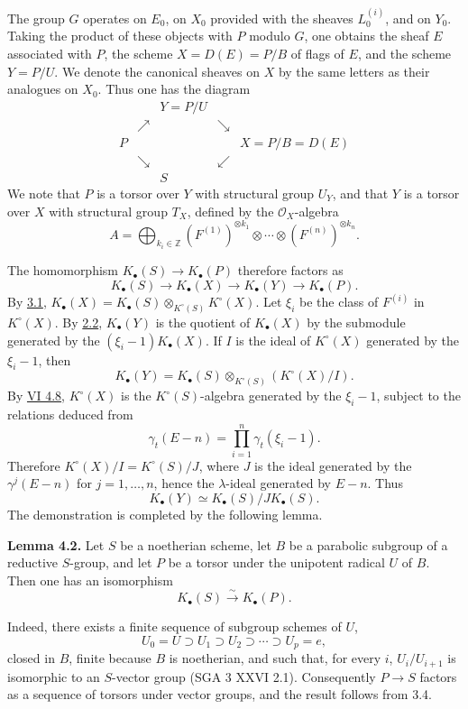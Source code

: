 The group $G$ operates on $E_0$, on $X_0$ provided with the sheaves $L_0^{(i)}$, and on $Y_0$. Taking the product of these objects with $P$ modulo $G$, one obtains the sheaf $E$ associated with $P$, the scheme $X=D(E)=P/B$ of flags of $E$, and the scheme $Y=P/U$. We denote the canonical sheaves on $X$ by the same letters as their analogues on $X_0$. Thus one has the diagram
\[
\begin{array}{ccccc}
&& Y=P/U &&\\[-0.2em]
& \nearrow && \searrow &\\[-0.2em]
P &&&& X=P/B=D(E)\\[-0.2em]
& \searrow && \swarrow &\\[-0.2em]
&& S &&
\end{array}
\]
We note that $P$ is a torsor over $Y$ with structural group $U_Y$, and that $Y$ is a torsor over $X$ with structural group $T_X$, defined by the $\mathcal O_X$-algebra
\[
 A=\bigoplus_{k_i\in\mathbb Z}(F^{(1)})^{\otimes k_1}\otimes\cdots\otimes(F^{(n)})^{\otimes k_n}.
\]

The homomorphism $K_\bullet(S)\to K_\bullet(P)$ therefore factors as
\[
 K_\bullet(S)\longrightarrow K_\bullet(X)\longrightarrow K_\bullet(Y)\longrightarrow K_\bullet(P).
\]
By \hyperlink{sga6.e09.prop.3-1}{3.1}, $K_\bullet(X)=K_\bullet(S)\otimes_{K^\circ(S)}K^\circ(X)$. Let $\xi_i$ be the class of $F^{(i)}$ in $K^\circ(X)$. By \hyperlink{sga6.e09.prop.2-2}{2.2}, $K_\bullet(Y)$ is the quotient of $K_\bullet(X)$ by the submodule generated by the $(\xi_i-1)K_\bullet(X)$. If $I$ is the ideal of $K^\circ(X)$ generated by the $\xi_i-1$, then
\[
 K_\bullet(Y)=K_\bullet(S)\otimes_{K^\circ(S)}(K^\circ(X)/I).
\]
By \hyperlink{sga6.e06.cor.4-8}{VI 4.8}, $K^\circ(X)$ is the $K^\circ(S)$-algebra generated by the $\xi_i-1$, subject to the relations deduced from
\[
 \gamma_t(E-n)=\prod_{i=1}^n\gamma_t(\xi_i-1).
\]
Therefore $K^\circ(X)/I=K^\circ(S)/J$, where $J$ is the ideal generated by the $\gamma^j(E-n)$ for $j=1,\ldots,n$, hence the $\lambda$-ideal generated by $E-n$. Thus
\[
 K_\bullet(Y)\simeq K_\bullet(S)/J K_\bullet(S).
\]
The demonstration is completed by the following lemma.

\textbf{Lemma 4.2.} Let $S$ be a noetherian scheme, let $B$ be a parabolic subgroup of a reductive $S$-group, and let $P$ be a torsor under the unipotent radical $U$ of $B$. Then one has an isomorphism
\[
 K_\bullet(S)\xrightarrow{\sim}K_\bullet(P).
\]

Indeed, there exists a finite sequence of subgroup schemes of $U$,
\[
 U_0=U\supset U_1\supset U_2\supset\cdots\supset U_p=e,
\]
closed in $B$, finite because $B$ is noetherian, and such that, for every $i$, $U_i/U_{i+1}$ is isomorphic to an $S$-vector group (SGA 3 XXVI 2.1). Consequently $P\to S$ factors as a sequence of torsors under vector groups, and the result follows from 3.4.

